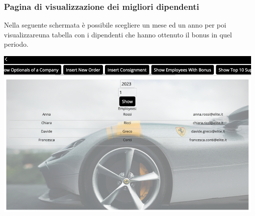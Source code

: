 \documentclass[11pt]{article}
\begin{document}
\subsubsection{Pagina di visualizzazione dei migliori dipendenti}
Nella seguente schermata è possibile scegliere un mese ed un anno per poi
visualizzareuna tabella con i dipendenti che hanno ottenuto il bonus in quel
periodo.

\begin{center}
    \includegraphics[width=\linewidth]{images/app/bestEmployees.png}
\end{center}
\end{document}
